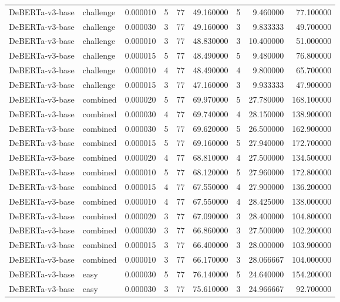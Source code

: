 \begin{tabular}{llrrrrrrr}
DeBERTa-v3-base & challenge & 0.000010 & 5 & 77 & 49.160000 & 5 & 9.460000 & 77.100000 \\
DeBERTa-v3-base & challenge & 0.000030 & 3 & 77 & 49.160000 & 3 & 9.833333 & 49.700000 \\
DeBERTa-v3-base & challenge & 0.000010 & 3 & 77 & 48.830000 & 3 & 10.400000 & 51.000000 \\
DeBERTa-v3-base & challenge & 0.000015 & 5 & 77 & 48.490000 & 5 & 9.480000 & 76.800000 \\
DeBERTa-v3-base & challenge & 0.000010 & 4 & 77 & 48.490000 & 4 & 9.800000 & 65.700000 \\
DeBERTa-v3-base & challenge & 0.000015 & 3 & 77 & 47.160000 & 3 & 9.933333 & 47.900000 \\
DeBERTa-v3-base & combined & 0.000020 & 5 & 77 & 69.970000 & 5 & 27.780000 & 168.100000 \\
DeBERTa-v3-base & combined & 0.000030 & 4 & 77 & 69.740000 & 4 & 28.150000 & 138.900000 \\
DeBERTa-v3-base & combined & 0.000030 & 5 & 77 & 69.620000 & 5 & 26.500000 & 162.900000 \\
DeBERTa-v3-base & combined & 0.000015 & 5 & 77 & 69.160000 & 5 & 27.940000 & 172.700000 \\
DeBERTa-v3-base & combined & 0.000020 & 4 & 77 & 68.810000 & 4 & 27.500000 & 134.500000 \\
DeBERTa-v3-base & combined & 0.000010 & 5 & 77 & 68.120000 & 5 & 27.960000 & 172.800000 \\
DeBERTa-v3-base & combined & 0.000015 & 4 & 77 & 67.550000 & 4 & 27.900000 & 136.200000 \\
DeBERTa-v3-base & combined & 0.000010 & 4 & 77 & 67.550000 & 4 & 28.425000 & 138.000000 \\
DeBERTa-v3-base & combined & 0.000020 & 3 & 77 & 67.090000 & 3 & 28.400000 & 104.800000 \\
DeBERTa-v3-base & combined & 0.000030 & 3 & 77 & 66.860000 & 3 & 27.500000 & 102.200000 \\
DeBERTa-v3-base & combined & 0.000015 & 3 & 77 & 66.400000 & 3 & 28.000000 & 103.900000 \\
DeBERTa-v3-base & combined & 0.000010 & 3 & 77 & 66.170000 & 3 & 28.066667 & 104.000000 \\
DeBERTa-v3-base & easy & 0.000030 & 5 & 77 & 76.140000 & 5 & 24.640000 & 154.200000 \\
DeBERTa-v3-base & easy & 0.000030 & 3 & 77 & 75.610000 & 3 & 24.966667 & 92.700000 \\

\end{tabular}
